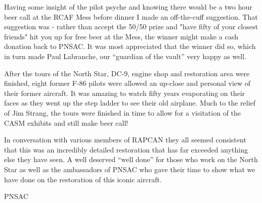 Having some insight of the pilot psyche and knowing there would be a
two hour beer call at the RCAF Mess before dinner I made an
off-the-cuff suggestion. That suggestion was - rather than accept the
50/50 prize and "have fifty of your closest friends" hit you up for
free beer at the Mess, the winner might make a cash donation back to
PNSAC. It was most appreciated that the winner did so, which in turn
made Paul Labranche, our ``guardian of the vault'' very happy as well.

After the tours of the North Star, DC-9, engine shop and restoration
area were finished, eight former F-86 pilots were allowed an up-close
and personal view of their former aircraft. It was amazing to watch
fifty years evaporating on their faces as they went up the step ladder
to see their old airplane. Much to the relief of Jim Strang, the tours
were finished in time to allow for a visitation of the CASM exhibits
and still make beer call!

In conversation with various members of RAPCAN they all seemed
consistent that this was an incredibly detailed restoration that has
far exceeded anything else they have seen. A well deserved ``well done''
for those who work on the North Star as well as the ambassadors of
PNSAC who gave their time to show what we have done on the restoration
of this iconic aircraft.


\begin{footnotesize}
    \raggedleft PNSAC\\
\end{footnotesize}



